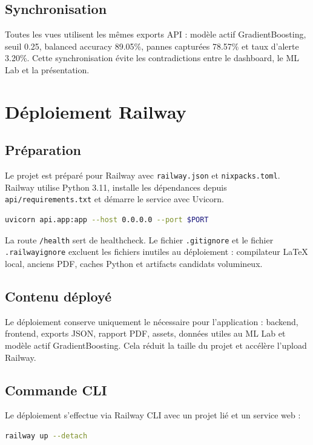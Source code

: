 \documentclass[12pt,a4paper]{report}
\begin{document}
\section{Synchronisation}
Toutes les vues utilisent les mêmes exports API : modèle actif GradientBoosting, seuil 0.25, balanced accuracy 89.05\%, pannes capturées 78.57\% et taux d'alerte 3.20\%. Cette synchronisation évite les contradictions entre le dashboard, le ML Lab et la présentation.

\chapter{Déploiement Railway}

\section{Préparation}
Le projet est préparé pour Railway avec \texttt{railway.json} et \texttt{nixpacks.toml}. Railway utilise Python 3.11, installe les dépendances depuis \texttt{api/requirements.txt} et démarre le service avec Uvicorn.

\begin{lstlisting}[language=bash,caption={Commande de démarrage Railway.}]
uvicorn api.app:app --host 0.0.0.0 --port $PORT
\end{lstlisting}

La route \texttt{/health} sert de healthcheck. Le fichier \texttt{.gitignore} et le fichier \texttt{.railwayignore} excluent les fichiers inutiles au déploiement : compilateur LaTeX local, anciens PDF, caches Python et artifacts candidats volumineux.

\section{Contenu déployé}
Le déploiement conserve uniquement le nécessaire pour l'application : backend, frontend, exports JSON, rapport PDF, assets, données utiles au ML Lab et modèle actif GradientBoosting. Cela réduit la taille du projet et accélère l'upload Railway.

\section{Commande CLI}
Le déploiement s'effectue via Railway CLI avec un projet lié et un service web :
\begin{lstlisting}[language=bash]
railway up --detach
\end{lstlisting}
\end{document}
